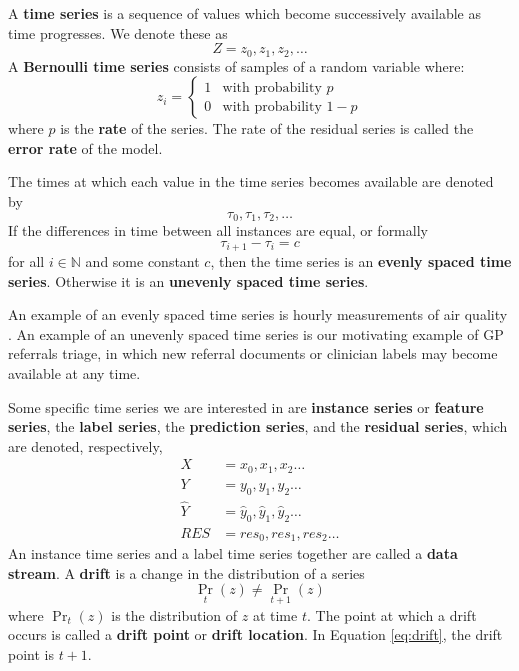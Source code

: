 
A {\bf time series} is a sequence of values which become successively available as time progresses. We denote these as
\begin{equation}
    Z = z_0,z_1,z_2,\dots
\end{equation}
A {\bf Bernoulli time series} consists of samples of a random variable where:
\begin{equation}
    z_i = \begin{cases}
    1 & \text{with probability $p$} \\
    0 & \text{with probability $1-p$}
    \end{cases}
\end{equation}
where $p$ is the {\bf rate} of the series. The rate of the residual series is called the {\bf error rate} of the model. 

The times at which each value in the time series becomes available are denoted by
\begin{equation}
    \tau_0,\tau_1,\tau_2,\dots
\end{equation}
If the differences in time between all instances are equal, or formally
\begin{equation}
    \tau_{i+1}-\tau_{i} = c
\end{equation}
for all $i\in\mathbb{N}$ and some constant $c$, then the time series is an {\bf evenly spaced time series}. Otherwise it is an {\bf unevenly spaced time series}. 

An example of an evenly spaced time series is hourly measurements of air quality \cite{ME}. An example of an unevenly spaced time series is our motivating example of GP referrals triage, in which new referral documents or clinician labels may become available at any time.

Some specific time series we are interested in are {\bf instance series} or {\bf feature series}, 
the {\bf label series},
the {\bf prediction series},
and the {\bf residual series}, which are denoted, respectively,
\begin{align}
    X &= x_0,x_1,x_2\dots \\
    Y &= y_0,y_1,y_2\dots \\
    \hat{Y} &= \hat{y}_0,\hat{y}_1,\hat{y}_2\dots \\
    RES &= res_0,res_1,res_2\dots
\end{align}
An instance time series and a label time series together are called a {\bf data stream}. A {\bf drift} is a change in the distribution of a series
\begin{equation}
    \Pr_t(z) \ne \Pr_{t+1}(z) \label{eq:drift}
\end{equation}
where $\Pr_t(z)$ is the distribution of $z$ at time $t$. The point at which a drift occurs is called a {\bf drift point} or {\bf drift location}. In Equation \ref{eq:drift}, the drift point is $t+1$.

